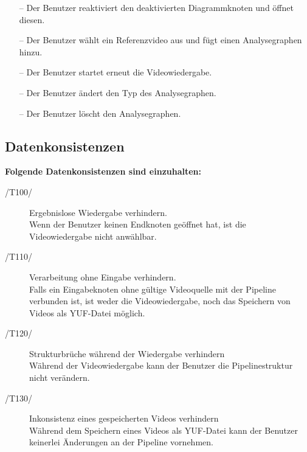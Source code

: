 \begin{description}
\begin{itemize}
			\item[--] Der Benutzer reaktiviert den deaktivierten Diagrammknoten und öffnet diesen.
			\item[--] Der Benutzer wählt ein Referenzvideo aus und fügt einen Analysegraphen hinzu.
			\item[--] Der Benutzer startet erneut die Videowiedergabe.
			\item[--] Der Benutzer ändert den Typ des Analysegraphen.
			\item[--] Der Benutzer löscht den Analysegraphen.
		\end{itemize}
\end{description}

\newpage

\subsection{Datenkonsistenzen}

\textbf{Folgende Datenkonsistenzen sind einzuhalten:}

\begin{description}
	\item[/T100/] Ergebnislose Wiedergabe verhindern. ~\\
		Wenn der Benutzer keinen Endknoten geöffnet hat, ist die Videowiedergabe nicht anwählbar.
	\item[/T110/] Verarbeitung ohne Eingabe verhindern. ~\\
		Falls ein Eingabeknoten ohne gültige Videoquelle mit der Pipeline verbunden ist, ist weder die Videowiedergabe, noch das Speichern von Videos als YUF-Datei möglich.
	\item[/T120/] Strukturbrüche während der Wiedergabe verhindern ~\\
		Während der Videowiedergabe kann der Benutzer die Pipelinestruktur nicht verändern.
	\item[/T130/] Inkonsistenz eines gespeicherten Videos verhindern ~\\
		Während dem Speichern eines Videos als YUF-Datei kann der Benutzer keinerlei Änderungen an der Pipeline vornehmen.
\end{description}

